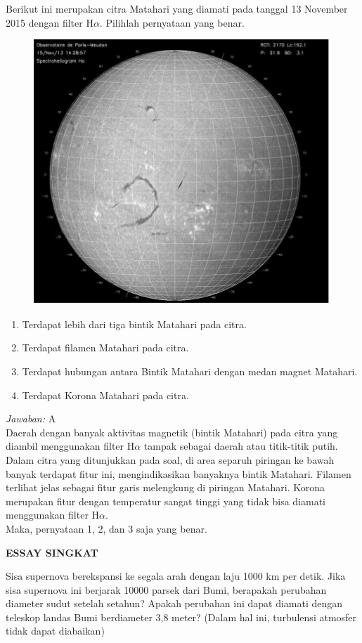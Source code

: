 \documentclass[11pt,fleqn]{exam}
\begin{document}
\begin{questions}
\question Berikut ini merupakan citra Matahari yang diamati pada tanggal 13 November 2015 dengan filter H$\alpha$. Pilihlah pernyataan yang benar.
\begin{figure}[h!]
\centering
\includegraphics[scale=0.7]{matahari.png}
\end{figure}
\begin{enumerate}
\item Terdapat lebih dari tiga bintik Matahari pada citra.
\item Terdapat filamen Matahari pada citra.
\item Terdapat hubungan antara Bintik Matahari dengan medan magnet Matahari.
\item Terdapat Korona Matahari pada citra.
\end{enumerate}

\textit{Jawaban: } A\\
Daerah dengan banyak aktivitas magnetik (bintik Matahari) pada citra yang diambil menggunakan filter H$\alpha$ tampak sebagai daerah atau titik-titik putih. Dalam citra yang ditunjukkan pada soal, di area separuh piringan ke bawah banyak terdapat fitur ini, mengindikasikan banyaknya bintik Matahari. Filamen terlihat jelas sebagai fitur garis melengkung di piringan Matahari. Korona merupakan fitur dengan temperatur sangat tinggi yang tidak bisa diamati menggunakan filter H$\alpha$.\\
Maka, pernyataan 1, 2, dan 3 saja yang benar.


\vspace{0.5cm}
\textbf{ESSAY SINGKAT}

\question Sisa supernova berekspansi ke segala arah dengan laju 1000 km per detik. Jika sisa supernova ini berjarak 10000 parsek dari Bumi, berapakah perubahan diameter sudut setelah setahun? Apakah perubahan ini dapat diamati dengan teleskop landas Bumi berdiameter 3,8 meter? (Dalam hal ini, turbulensi atmosfer tidak dapat diabaikan)


\end{questions}
\end{document}
